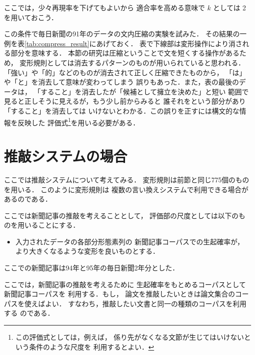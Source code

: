 ここでは，少々再現率を下げてもよいから
適合率を高める意味で $k$ としては 2 を用いておこう．

この条件で毎日新聞の91年のデータの文内圧縮の実験を試みた．
その結果の一例を表\ref{tab:compress_result}にあげておく．
表で下線部は変形操作により消される部分を意味する．
本節の研究は圧縮ということで文を短くする操作があるため，
変形規則としては消去するパターンのものが用いられていると思われる．
「強い」や「的」などのものが消去されて正しく圧縮できたものから，
「は」や「と」を消去して意味が変わってしまう
誤りもあった．また，表の最後のデータは，
「すること」を消去したが「候補として擁立を決めた」と短い
範囲で見ると正しそうに見えるが，もう少し前からみると
誰それをという部分があり「すること」を消去しては
いけないとわかる．この誤りを正すには構文的な情報を反映した
評価式\footnote{この評価式としては，例えば，
係り先がなくなる文節が生じてはいけないという条件のような尺度を
利用するとよい．}を用いる必要がある．

\section{推敲システムの場合}

ここでは推敲システムについて考えてみる．
変形規則は前節と同じ775個のものを用いる．
このように変形規則は
複数の言い換えシステムで利用できる場合があるのである．

ここでは新聞記事の推敲を考えることとして，
評価部の尺度としては以下のものを用いることにする．
\begin{itemize}
\item 
  入力されたデータの各部分形態素列の
  新聞記事コーパスでの生起確率が，
  より大きくなるような変形を良いものとする．

\end{itemize}
ここでの新聞記事は94年と95年の毎日新聞2年分とした．

ここでは，新聞記事の推敲を考えるために
生起確率をもとめるコーパスとして新聞記事コーパスを
利用する．もし，
論文を推敲したいときは論文集合のコーパスを使えばよい．
すなわち，推敲したい文書と同一の種類のコーパスを利用する
のである．

